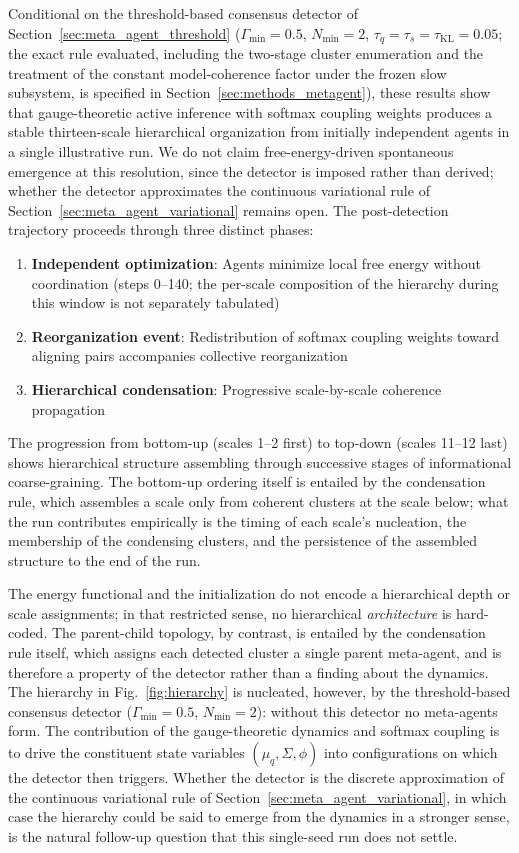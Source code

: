 \documentclass[11pt]{article}
\begin{document}
Conditional on the threshold-based consensus detector of Section~\ref{sec:meta_agent_threshold} ($\Gamma_{\min} = 0.5$, $N_{\min} = 2$, $\tau_q = \tau_s = \tau_{\mathrm{KL}} = 0.05$; the exact rule evaluated, including the two-stage cluster enumeration and the treatment of the constant model-coherence factor under the frozen slow subsystem, is specified in Section~\ref{sec:methods_metagent}), these results show that gauge-theoretic active inference with softmax coupling weights produces a stable thirteen-scale hierarchical organization from initially independent agents in a single illustrative run. We do not claim free-energy-driven spontaneous emergence at this resolution, since the detector is imposed rather than derived; whether the detector approximates the continuous variational rule of Section~\ref{sec:meta_agent_variational} remains open. The post-detection trajectory proceeds through three distinct phases:
\begin{enumerate}
\item \textbf{Independent optimization}: Agents minimize local free energy without coordination (steps 0--140; the per-scale composition of the hierarchy during this window is not separately tabulated)
\item \textbf{Reorganization event}: Redistribution of softmax coupling weights toward aligning pairs accompanies collective reorganization
\item \textbf{Hierarchical condensation}: Progressive scale-by-scale coherence propagation
\end{enumerate}

The progression from bottom-up (scales 1--2 first) to top-down (scales 11--12 last) shows hierarchical structure assembling through successive stages of informational coarse-graining. The bottom-up ordering itself is entailed by the condensation rule, which assembles a scale only from coherent clusters at the scale below; what the run contributes empirically is the timing of each scale's nucleation, the membership of the condensing clusters, and the persistence of the assembled structure to the end of the run.

The energy functional and the initialization do not encode a hierarchical depth or scale assignments; in that restricted sense, no hierarchical \emph{architecture} is hard-coded. The parent-child topology, by contrast, is entailed by the condensation rule itself, which assigns each detected cluster a single parent meta-agent, and is therefore a property of the detector rather than a finding about the dynamics. The hierarchy in Fig.~\ref{fig:hierarchy} is nucleated, however, by the threshold-based consensus detector ($\Gamma_{\min} = 0.5$, $N_{\min} = 2$): without this detector no meta-agents form. The contribution of the gauge-theoretic dynamics and softmax coupling is to drive the constituent state variables $(\mu_q, \Sigma, \phi)$ into configurations on which the detector then triggers. Whether the detector is the discrete approximation of the continuous variational rule of Section~\ref{sec:meta_agent_variational}, in which case the hierarchy could be said to emerge from the dynamics in a stronger sense, is the natural follow-up question that this single-seed run does not settle.
\end{document}
